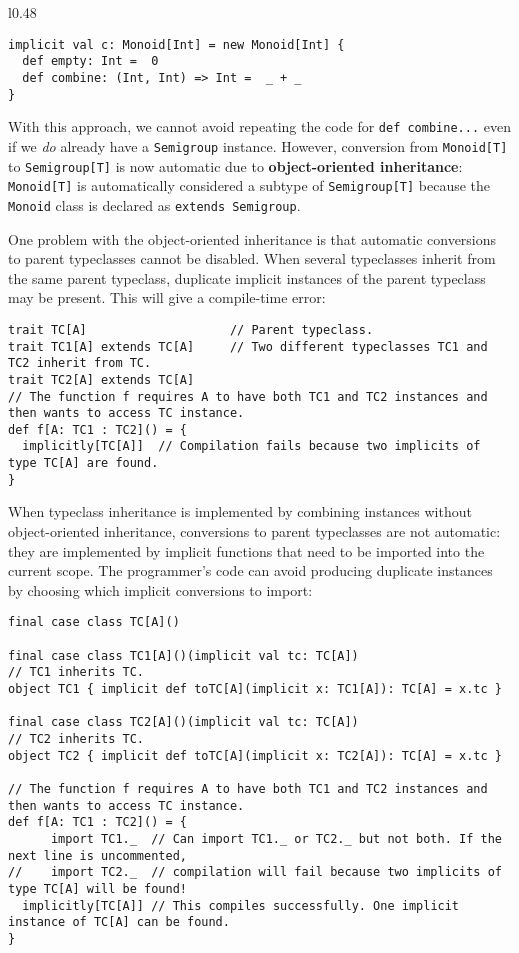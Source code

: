 \begin{wrapfigure}{l}{0.48\columnwidth}%
\vspace{-0.95\baselineskip}
\begin{lstlisting}
implicit val c: Monoid[Int] = new Monoid[Int] {
  def empty: Int =  0
  def combine: (Int, Int) => Int =  _ + _
}
\end{lstlisting}

\vspace{-1.1\baselineskip}
\end{wrapfigure}%

\noindent With this approach, we cannot avoid repeating the code for
\lstinline!def combine...! even if we \emph{do} already have a \lstinline!Semigroup!
instance. However, conversion from \lstinline!Monoid[T]! to \lstinline!Semigroup[T]!
is now automatic due to \textbf{object-oriented inheritance}:
\lstinline!Monoid[T]! is automatically considered a subtype of \lstinline!Semigroup[T]!
because the \lstinline!Monoid! class is declared as \lstinline!extends Semigroup!.

One problem with the object-oriented inheritance is that automatic
conversions to parent typeclasses cannot be disabled. When several
typeclasses inherit from the same parent typeclass, duplicate implicit
instances of the parent typeclass may be present. This will give a
compile-time error:
\begin{lstlisting}
trait TC[A]                    // Parent typeclass.
trait TC1[A] extends TC[A]     // Two different typeclasses TC1 and TC2 inherit from TC.
trait TC2[A] extends TC[A]
// The function f requires A to have both TC1 and TC2 instances and then wants to access TC instance.
def f[A: TC1 : TC2]() = {
  implicitly[TC[A]]  // Compilation fails because two implicits of type TC[A] are found.
}
\end{lstlisting}

When typeclass inheritance is implemented by combining instances without
object-oriented inheritance, conversions to parent typeclasses are
not automatic: they are implemented by implicit functions that need
to be imported into the current scope. The programmer's code can avoid
producing duplicate instances by choosing which implicit conversions
to import:
\begin{lstlisting}
final case class TC[A]()

final case class TC1[A]()(implicit val tc: TC[A])                      // TC1 inherits TC.
object TC1 { implicit def toTC[A](implicit x: TC1[A]): TC[A] = x.tc }

final case class TC2[A]()(implicit val tc: TC[A])                      // TC2 inherits TC.
object TC2 { implicit def toTC[A](implicit x: TC2[A]): TC[A] = x.tc }

// The function f requires A to have both TC1 and TC2 instances and then wants to access TC instance.
def f[A: TC1 : TC2]() = {
      import TC1._  // Can import TC1._ or TC2._ but not both. If the next line is uncommented,
//    import TC2._  // compilation will fail because two implicits of type TC[A] will be found!
  implicitly[TC[A]] // This compiles successfully. One implicit instance of TC[A] can be found.
}
\end{lstlisting}

